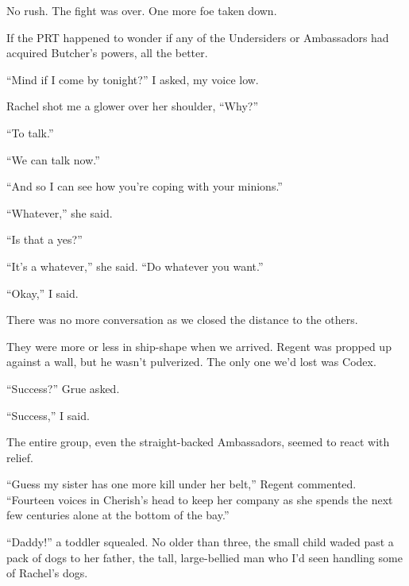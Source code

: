 No rush.  The fight was over.  One more foe taken down.



If the PRT happened to wonder if any of the Undersiders or Ambassadors had acquired Butcher's powers, all the better.



``Mind if I come by tonight?'' I asked, my voice low.



Rachel shot me a glower over her shoulder, ``Why?''



``To talk.''



``We can talk now.''



``And so I can see how you're coping with your minions.''



``Whatever,'' she said.



``Is that a yes?''



``It's a whatever,'' she said.  ``Do whatever you want.''



``Okay,'' I said.



There was no more conversation as we closed the distance to the others.



They were more or less in ship-shape when we arrived.  Regent was propped up against a wall, but he wasn't pulverized.  The only one we'd lost was Codex.



``Success?'' Grue asked.



``Success,'' I said.



The entire group, even the straight-backed Ambassadors, seemed to react with relief.



``Guess my sister has one more kill under her belt,'' Regent commented.  ``Fourteen voices in Cherish's head to keep her company as she spends the next few centuries alone at the bottom of the bay.''



\blacksquare



``Daddy!'' a toddler squealed.  No older than three, the small child waded past a pack of dogs to her father, the tall, large-bellied man who I'd seen handling some of Rachel's dogs.



